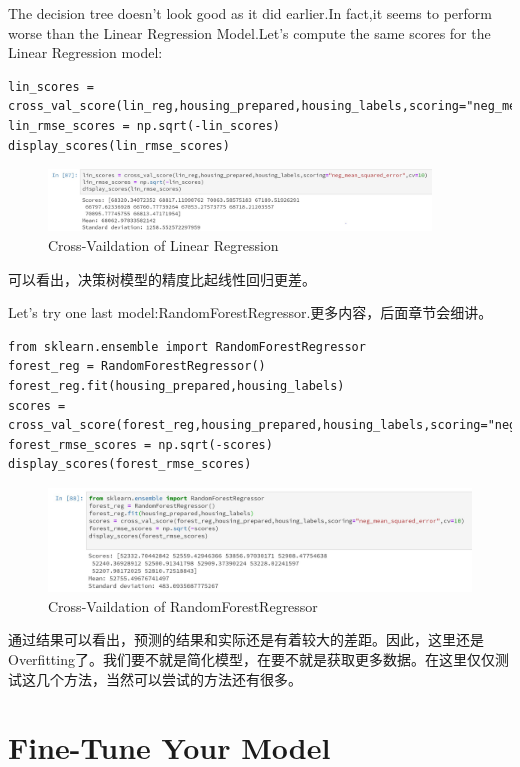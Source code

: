 \documentclass[UTF8]{ctexart}
\begin{document}
The decision tree doesn't look good as it did earlier.In fact,it seems to perform worse than the Linear Regression Model.Let's compute the same scores for the Linear Regression model:
\begin{lstlisting}
lin_scores = cross_val_score(lin_reg,housing_prepared,housing_labels,scoring="neg_mean_squared_error",cv=10)
lin_rmse_scores = np.sqrt(-lin_scores)
display_scores(lin_rmse_scores)
\end{lstlisting}

\begin{figure}[H]
\centering
\includegraphics[width = 4in]{lin_cross_val.JPG}
\caption{Cross-Vaildation of Linear Regression}
\end{figure}

可以看出，决策树模型的精度比起线性回归更差。

Let's try one last model:RandomForestRegressor.更多内容，后面章节会细讲。
\begin{lstlisting}
from sklearn.ensemble import RandomForestRegressor
forest_reg = RandomForestRegressor()
forest_reg.fit(housing_prepared,housing_labels)
scores = cross_val_score(forest_reg,housing_prepared,housing_labels,scoring="neg_mean_squared_error",cv=10)
forest_rmse_scores = np.sqrt(-scores)
display_scores(forest_rmse_scores)
\end{lstlisting}

\begin{figure}[H]
\centering
\includegraphics[width = 6in]{forest_val.JPG}
\caption{Cross-Vaildation of RandomForestRegressor}
\end{figure}

通过结果可以看出，预测的结果和实际还是有着较大的差距。因此，这里还是Overfitting了。我们要不就是简化模型，在要不就是获取更多数据。在这里仅仅测试这几个方法，当然可以尝试的方法还有很多。


\section{Fine-Tune Your Model}
\end{document}
